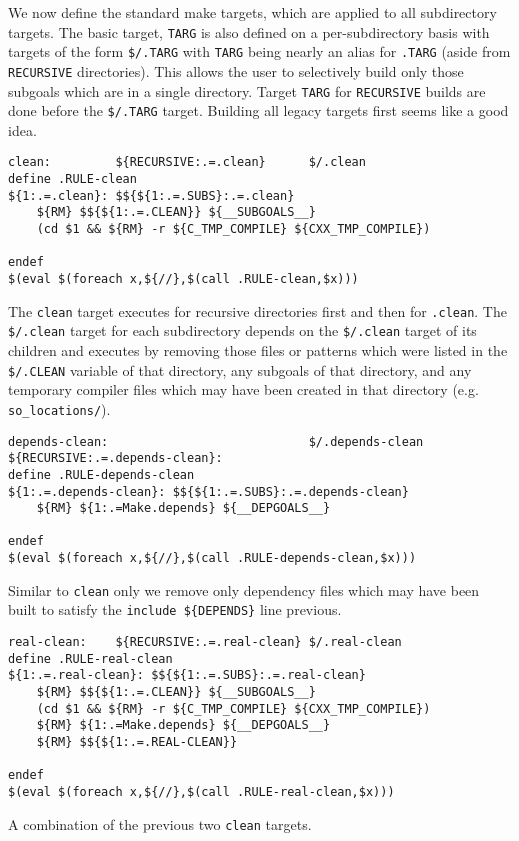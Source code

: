 \documentclass{article}
\begin{document}
We now define the standard make targets, which are applied to all
subdirectory targets.  The basic target, \verb+TARG+ is also defined
on a per-subdirectory basis with targets of the form \verb+$/.TARG+
with \verb+TARG+ being nearly an alias for \verb+.TARG+ (aside from
\verb+RECURSIVE+ directories).  This allows
the user to selectively build only those subgoals which are in a
single directory.  Target \verb+TARG+ for \verb+RECURSIVE+ builds are
done before the \verb+$/.TARG+ target.  Building all legacy targets
first seems like a good idea.

\begin{verbatim}
clean:         ${RECURSIVE:.=.clean}      $/.clean
define .RULE-clean
${1:.=.clean}: $${${1:.=.SUBS}:.=.clean}
	${RM} $${${1:.=.CLEAN}} ${__SUBGOALS__}
	(cd $1 && ${RM} -r ${C_TMP_COMPILE} ${CXX_TMP_COMPILE})

endef
$(eval $(foreach x,${//},$(call .RULE-clean,$x)))
\end{verbatim}
The \verb+clean+ target executes for recursive directories first
and then for \verb+.clean+.  The \verb+$/.clean+ target for
each subdirectory depends on the \verb+$/.clean+ target of its
children and executes by removing those files or patterns which were listed
in the \verb+$/.CLEAN+ variable of that directory, any subgoals of
that directory, and any temporary compiler files which may have been
created in that directory (e.g. \verb+so_locations/+).

\begin{verbatim}
depends-clean:                            $/.depends-clean
${RECURSIVE:.=.depends-clean}:
define .RULE-depends-clean
${1:.=.depends-clean}: $${${1:.=.SUBS}:.=.depends-clean}
	${RM} ${1:.=Make.depends} ${__DEPGOALS__}

endef
$(eval $(foreach x,${//},$(call .RULE-depends-clean,$x)))
\end{verbatim}
Similar to \verb+clean+ only we remove only dependency files which
may have been built to satisfy the \verb+include ${DEPENDS}+ line
previous.

\begin{verbatim}
real-clean:    ${RECURSIVE:.=.real-clean} $/.real-clean
define .RULE-real-clean
${1:.=.real-clean}: $${${1:.=.SUBS}:.=.real-clean}
	${RM} $${${1:.=.CLEAN}} ${__SUBGOALS__}
	(cd $1 && ${RM} -r ${C_TMP_COMPILE} ${CXX_TMP_COMPILE})
	${RM} ${1:.=Make.depends} ${__DEPGOALS__}
	${RM} $${${1:.=.REAL-CLEAN}}

endef
$(eval $(foreach x,${//},$(call .RULE-real-clean,$x)))
\end{verbatim}
A combination of the previous two \verb+clean+ targets.
\end{document}
